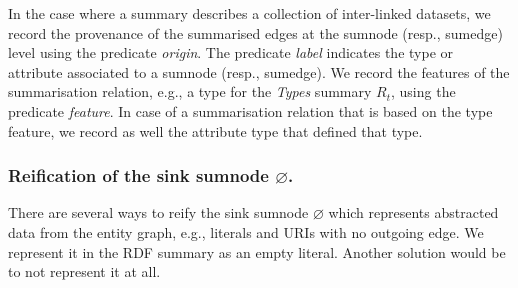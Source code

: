 In the case where a summary describes a collection of inter-linked datasets, we record the provenance of the summarised edges at the sumnode (resp., sumedge) level using the predicate \emph{origin}. The predicate \emph{label} indicates the type or attribute associated to a sumnode (resp., sumedge). We record the features of the summarisation relation, e.g., a type for the \emph{Types} summary $R_t$, using the predicate \emph{feature}. In case of a summarisation relation that is based on the type feature, we record as well the attribute type that defined that type.

\subsubsection{Reification of the sink sumnode $\varnothing$.}

There are several ways to reify the sink sumnode $\varnothing$ which represents abstracted data from the entity graph, e.g., literals and URIs with no outgoing edge. We represent it in the RDF summary as an empty literal. Another solution would be to not represent it at all.

